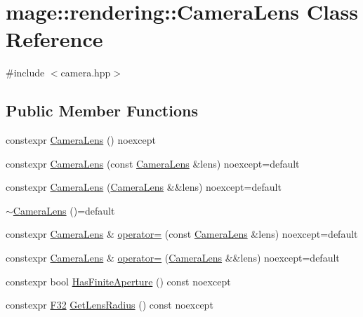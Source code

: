 \hypertarget{classmage_1_1rendering_1_1_camera_lens}{}\section{mage\+:\+:rendering\+:\+:Camera\+Lens Class Reference}
\label{classmage_1_1rendering_1_1_camera_lens}


{\ttfamily \#include $<$camera.\+hpp$>$}

\subsection*{Public Member Functions}
\begin{DoxyCompactItemize}
\item 
constexpr \hyperlink{classmage_1_1rendering_1_1_camera_lens_aa17be03069e7150aaaaa12cd2bd161fc}{Camera\+Lens} () noexcept
\item 
constexpr \hyperlink{classmage_1_1rendering_1_1_camera_lens_a69c6788001ad02b1ee229d530ded8fe0}{Camera\+Lens} (const \hyperlink{classmage_1_1rendering_1_1_camera_lens}{Camera\+Lens} \&lens) noexcept=default
\item 
constexpr \hyperlink{classmage_1_1rendering_1_1_camera_lens_a59311c60fc8625a38c04edbb97e23179}{Camera\+Lens} (\hyperlink{classmage_1_1rendering_1_1_camera_lens}{Camera\+Lens} \&\&lens) noexcept=default
\item 
\hyperlink{classmage_1_1rendering_1_1_camera_lens_ad01ffa0adfbdb43e2cf1ed6cbb80092a}{$\sim$\+Camera\+Lens} ()=default
\item 
constexpr \hyperlink{classmage_1_1rendering_1_1_camera_lens}{Camera\+Lens} \& \hyperlink{classmage_1_1rendering_1_1_camera_lens_addbc0f6e5ca70e491022edde1bf6f691}{operator=} (const \hyperlink{classmage_1_1rendering_1_1_camera_lens}{Camera\+Lens} \&lens) noexcept=default
\item 
constexpr \hyperlink{classmage_1_1rendering_1_1_camera_lens}{Camera\+Lens} \& \hyperlink{classmage_1_1rendering_1_1_camera_lens_af2c0c0b55951ecec1aa96d452960fe3f}{operator=} (\hyperlink{classmage_1_1rendering_1_1_camera_lens}{Camera\+Lens} \&\&lens) noexcept=default
\item 
constexpr bool \hyperlink{classmage_1_1rendering_1_1_camera_lens_a09a7cc18ca89da0c177c4f7dc0bbcc41}{Has\+Finite\+Aperture} () const noexcept
\item 
constexpr \hyperlink{namespacemage_aa97e833b45f06d60a0a9c4fc22ae02c0}{F32} \hyperlink{classmage_1_1rendering_1_1_camera_lens_a2cfbec82b5e74c9a481d53944ad6a508}{Get\+Lens\+Radius} () const noexcept

\end{DoxyCompactItemize}
